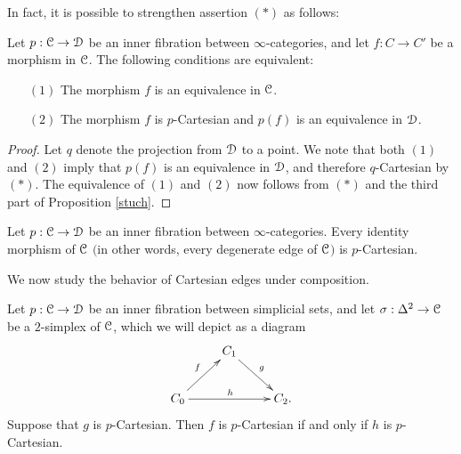 In fact, it is possible to strengthen assertion $(\ast)$ as follows:

\begin{proposition}\label{universalequiv}
Let $p: \operatorname{\mathcal{C}} \rightarrow \operatorname{\mathcal{D}}$ be an inner fibration between $\infty$-categories, and let $f: C \rightarrow C'$ be a morphism in $\operatorname{\mathcal{C}}$. The following conditions are equivalent:
\begin{itemize}
\item[$(1)$] The morphism $f$ is an equivalence in $\operatorname{\mathcal{C}}$.
\item[$(2)$] The morphism $f$ is $p$-Cartesian and $p(f)$ is an equivalence in $\operatorname{\mathcal{D}}$.
\end{itemize}
\end{proposition}

\begin{proof}
Let $q$ denote the projection from $\operatorname{\mathcal{D}}$ to a point. We note that both $(1)$ and $(2)$
imply that $p(f)$ is an equivalence in $\operatorname{\mathcal{D}}$, and therefore $q$-Cartesian by $(\ast)$.
The equivalence of $(1)$ and $(2)$ now follows from $(\ast)$ and the third part of Proposition \ref{stuch}.
\end{proof}

\begin{corollary}\label{corpal}
Let $p: \operatorname{\mathcal{C}} \rightarrow \operatorname{\mathcal{D}}$ be an inner fibration between $\infty$-categories. Every identity morphism of $\operatorname{\mathcal{C}}$ $($in other words, every degenerate edge of $\operatorname{\mathcal{C}}${}$)$ is $p$-Cartesian.
\end{corollary}

We now study the behavior of Cartesian edges under composition.

\begin{proposition}\label{protohermes}
Let $p: \operatorname{\mathcal{C}} \rightarrow \operatorname{\mathcal{D}}$ be an inner fibration between simplicial sets, and let
$\sigma: \Delta^2 \rightarrow \operatorname{\mathcal{C}}$ be a $2$-simplex of $\operatorname{\mathcal{C}}$, which we will depict as
a diagram
$$ \xymatrix{ & C_1 \ar[dr]^{g} & \\
C_0 \ar[ur]^{f} \ar[rr]^{h} & & C_2. }$$
Suppose that $g$ is $p$-Cartesian. Then $f$ is $p$-Cartesian if and only if $h$ is $p$-Cartesian.
\end{proposition}

